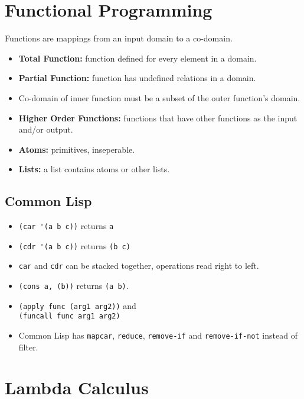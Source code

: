 \documentclass[landscape, letterpaper]{extarticle}
\theoremstyle{definition}
\begin{document}
\begin{multicols}{3}
    \section*{Functional Programming}
    Functions are mappings from an input domain to a co-domain.
    \begin{itemize}[noitemsep,nolistsep]
        \item \textbf{Total Function:} function defined for every element in a domain.
        \item \textbf{Partial Function:} function has undefined relations in a domain.
        \item Co-domain of inner function must be a subset of the outer function's domain.
        \item \textbf{Higher Order Functions:} functions that have other functions as the input and/or output.
        \item \textbf{Atoms:} primitives, inseperable.
        \item \textbf{Lists:} a list contains atoms or other lists.
    \end{itemize}
    \subsection*{Common Lisp}
    \begin{itemize}[noitemsep,nolistsep]
        \item \verb|(car '(a b c))| returns \verb|a|
        \item \verb|(cdr '(a b c))| returns \verb|(b c)|
        \item \verb|car| and \verb|cdr| can be stacked together, operations read right to left.
        \item \verb|(cons a, (b))| returns \verb|(a b)|.
        \item \verb|(apply func (arg1 arg2))| and\\\verb|(funcall func arg1 arg2)|
        \item Common Lisp has \verb|mapcar|, \verb|reduce|, \verb|remove-if| and \verb|remove-if-not| instead of filter.
    \end{itemize}
    \section*{Lambda Calculus}

\end{multicols}
\end{document}
